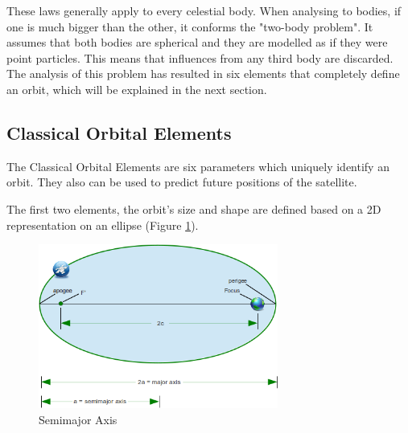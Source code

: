 These laws generally apply to every celestial body. When analysing to bodies, if one is much bigger than the other, it conforms the "two-body problem". It assumes that both bodies are spherical and they are modelled as if they were point particles. This means that influences from any third body are discarded. The analysis of this problem has resulted in six elements that completely define an orbit, which will be explained in the next section.


\subsection{Classical Orbital Elements}\label{2.2}
The Classical Orbital Elements are six parameters which uniquely identify an orbit. They also can be used to predict future positions of the satellite.\cite{IntAstr}

The first two elements, the orbit's size and shape are defined based on a 2D representation on an ellipse (Figure \ref{f2.1}).

\begin{figure}[H]
\centerline{\includegraphics[width=0.7\textwidth]{images/Ellipse.png}}
\caption{Semimajor Axis}
\label{f2.1}
\end{figure}

